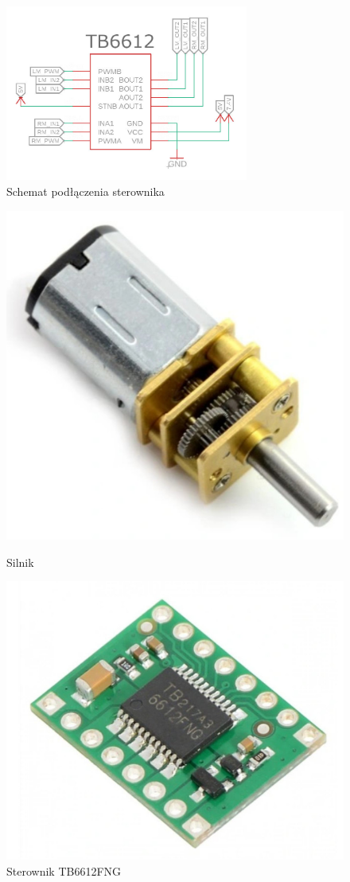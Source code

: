 \documentclass[polish,polish,a4paper]{article}
\begin{document}
         \begin{figure}[ht!]
        \centering
        \includegraphics[width=80mm]{Scheme/Silniki.jpg}
        \caption{Schemat podłączenia sterownika\label{overflow}}
        \end{figure}   
        
        \begin{figure}[!htb]
       \begin{minipage}{0.3\textwidth}
         \centering
         \includegraphics[width=.7\linewidth]{photo/silnik.jpg}
         \caption{Silnik}\label{Fig:Data1}
       \end{minipage}\hfill
       \begin{minipage}{0.3\textwidth}
         \centering
         \includegraphics[width=.7\linewidth]{photo/TB6612FNG.jpg}
         \caption{Sterownik TB6612FNG}\label{Fig:Data2}
       \end{minipage}
        \end{figure}
    \newpage
\end{document}
